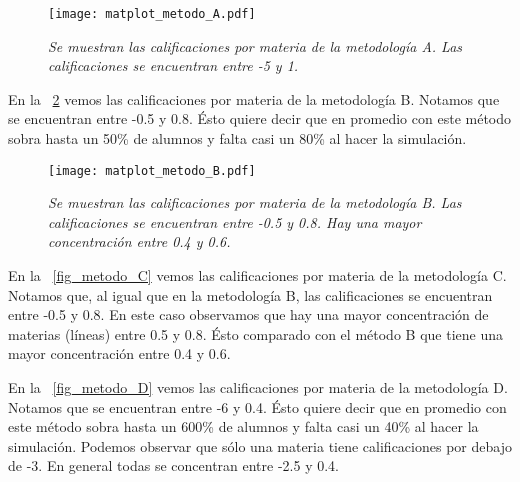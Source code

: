 \begin{figure}[H]
\centering
\texttt{[image: matplot\_metodo\_A.pdf]} %
\caption[\textit{Calificaciones metodología A}]{\textit{Se muestran las calificaciones por materia de la metodología A. Las calificaciones se encuentran entre -5 y 1.}}\label{fig_metodo_A}
\end{figure}


En la \figurename{~\ref{fig_metodo_B}} vemos las calificaciones por materia de la metodología B. Notamos que se encuentran entre -0.5 y 0.8. Ésto quiere decir que en promedio con este método sobra hasta un 50\% de alumnos y falta casi un 80\% al hacer la simulación.

\begin{figure}[H]
\centering
\texttt{[image: matplot\_metodo\_B.pdf]} %
\caption[\textit{Calificaciones metodología B}]{\textit{Se muestran las calificaciones por materia de la metodología B. Las calificaciones se encuentran entre -0.5 y 0.8. Hay una mayor concentración entre 0.4 y 0.6.}}\label{fig_metodo_B}
\end{figure}

En la \figurename{~\ref{fig_metodo_C}} vemos las calificaciones por materia de la metodología C. Notamos que, al igual que en la metodología B, las calificaciones se encuentran entre -0.5 y 0.8. En este caso observamos que hay una mayor concentración de materias (líneas) entre 0.5 y 0.8. Ésto comparado con el método B que tiene una mayor concentración entre 0.4 y 0.6.


En la \figurename{~\ref{fig_metodo_D}} vemos las calificaciones por materia de la metodología D. Notamos que se encuentran entre -6 y 0.4. Ésto quiere decir que en promedio con este método sobra hasta un 600\% de alumnos y falta casi un 40\% al hacer la simulación. Podemos observar que sólo una materia tiene calificaciones por debajo de -3. En general todas se concentran entre -2.5 y 0.4.




